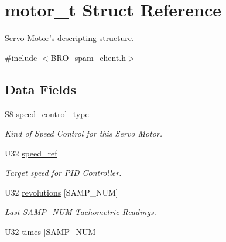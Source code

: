 \hypertarget{structmotor__t}{
\section{motor\_\-t Struct Reference}
\label{structmotor__t}
}


Servo Motor's descripting structure.  




{\ttfamily \#include $<$BRO\_\-spam\_\-client.h$>$}

\subsection*{Data Fields}
\begin{DoxyCompactItemize}
\item 
S8 \hyperlink{structmotor__t_a5b17b9088a3d9bb06293673a7077411c}{speed\_\-control\_\-type}
\begin{DoxyCompactList}\small\item\em Kind of Speed Control for this Servo Motor. \item\end{DoxyCompactList}\item 
U32 \hyperlink{structmotor__t_a3fc8cc6c0b771418981cb5df670e3d6c}{speed\_\-ref}
\begin{DoxyCompactList}\small\item\em Target speed for PID Controller. \item\end{DoxyCompactList}\item 
U32 \hyperlink{structmotor__t_a5c97ee29120bfb2cc43ca32bbcf0d766}{revolutions} \mbox{[}SAMP\_\-NUM\mbox{]}
\begin{DoxyCompactList}\small\item\em Last SAMP\_\-NUM Tachometric Readings. \item\end{DoxyCompactList}\item 
\hypertarget{structmotor__t_a45a66de576d1f141336441d722f9613c}{
U32 \hyperlink{structmotor__t_a45a66de576d1f141336441d722f9613c}{times} \mbox{[}SAMP\_\-NUM\mbox{]}}
\label{structmotor__t_a45a66de576d1f141336441d722f9613c}


\end{DoxyCompactItemize}
